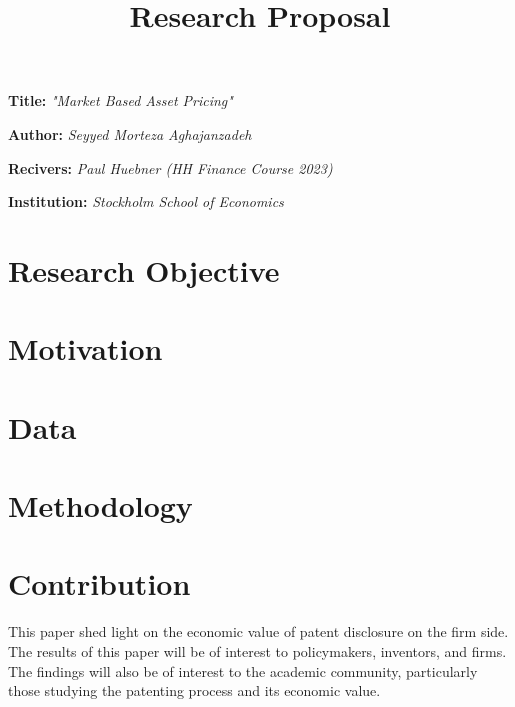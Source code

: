 \documentclass[a4paper]{article}
\title{\textbf{Research Proposal}}
\author{}
\date{}
\newcommand{\namelistlabel}[1]{\mbox{#1}\hfil}
\newenvironment{namelist}[1]{%
	\begin{list}{}
		{
			\let\makelabel\namelistlabel
			\settowidth{\labelwidth}{#1}
			\setlength{\leftmargin}{1.1\labelwidth}
		}
	}{%
\end{list}}
\begin{document}
\maketitle
\begin{namelist}{xxxxxxxxxxxx}
	\item[{\bf Title:}]
	\textit{"Market Based Asset Pricing"}
	\item[{\bf Author:}]
	\textit{ Seyyed Morteza Aghajanzadeh}
	\item[{\bf Recivers:}]
	\textit{Paul Huebner (HH Finance Course 2023)}
	\item[{\bf Institution:}]
	\textit{	Stockholm School of Economics}
\end{namelist}


\section*{Research Objective}



\section*{Motivation}


\section*{Data}


\section*{Methodology}


\section*{Contribution}
This paper shed light on the economic value of patent disclosure on the firm side. The results of this paper will be of interest to policymakers, inventors, and firms. The findings will also be of interest to the academic community, particularly those studying the patenting process and its economic value.



	



	{
	\footnotesize
	
	
}
\end{document}
